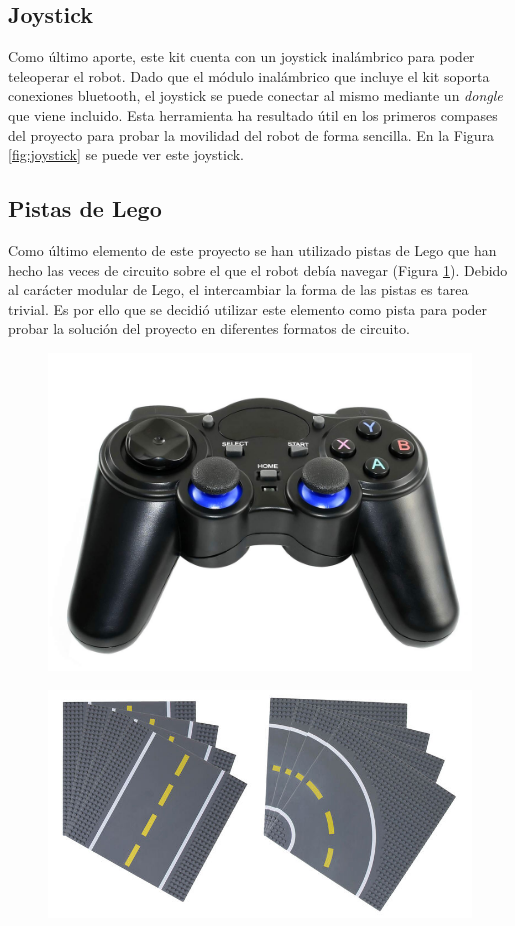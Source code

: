\subsection{Joystick}

Como último aporte, este kit cuenta con un joystick inalámbrico para poder teleoperar el robot. Dado que el módulo inalámbrico que incluye el kit soporta conexiones bluetooth, el joystick se puede conectar al mismo mediante un \textit{dongle} que viene incluido. Esta herramienta ha resultado útil en los primeros compases del proyecto para probar la movilidad del robot de forma sencilla. En la Figura \ref{fig:joystick} se puede ver este joystick.

\subsection{Pistas de Lego}

Como último elemento de este proyecto se han utilizado pistas de Lego que han hecho las veces de circuito sobre el que el robot debía navegar (Figura \ref{fig:legos}). Debido al carácter modular de Lego, el intercambiar la forma de las pistas es tarea trivial. Es por ello que se decidió utilizar este elemento como pista para poder probar la solución del proyecto en diferentes formatos de circuito.

\begin{figure}
\centering
\begin{minipage}{.5\textwidth}
  \centering
  \includegraphics[width=.4\linewidth]{img/joystick}
  \label{fig:joystick}
\end{minipage}%
\begin{minipage}{.5\textwidth}
  \centering
  \includegraphics[width=.6\linewidth]{img/legos}
  \label{fig:legos}
\end{minipage}
\end{figure}

